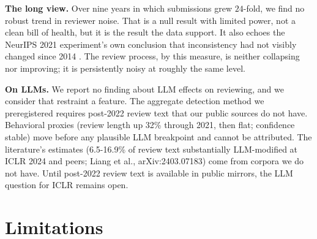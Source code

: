 \documentclass[10pt]{article}
\begin{document}
\textbf{The long view.} Over nine years in which submissions grew $24$-fold, we find no robust trend in reviewer noise. That is a null result with limited power, not a clean bill of health, but it is the result the data support. It also echoes the NeurIPS 2021 experiment's own conclusion that inconsistency had not visibly changed since 2014 \citep{beygelzimer2023}. The review process, by this measure, is neither collapsing nor improving; it is persistently noisy at roughly the same level.

\textbf{On LLMs.} We report no finding about LLM effects on reviewing, and we consider that restraint a feature. The aggregate detection method we preregistered requires post-2022 review text that our public sources do not have. Behavioral proxies (review length up 32\% through 2021, then flat; confidence stable) move before any plausible LLM breakpoint and cannot be attributed. The literature's estimates (6.5-16.9\% of review text substantially LLM-modified at ICLR 2024 and peers; Liang et al., arXiv:2403.07183) come from corpora we do not have. Until post-2022 review text is available in public mirrors, the LLM question for ICLR remains open.

\section{Limitations}
\end{document}
